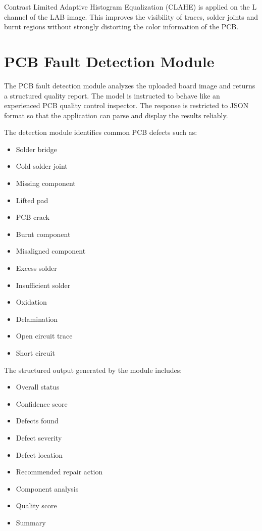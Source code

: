 \documentclass[12pt,a4paper]{report}
\begin{document}
Contrast Limited Adaptive Histogram Equalization (CLAHE) is applied on the L channel of the LAB image. This improves the visibility of traces, solder joints and burnt regions without strongly distorting the color information of the PCB.

\chapter{PCB Fault Detection Module}

The PCB fault detection module analyzes the uploaded board image and returns a structured quality report. The model is instructed to behave like an experienced PCB quality control inspector. The response is restricted to JSON format so that the application can parse and display the results reliably.

The detection module identifies common PCB defects such as:

\begin{itemize}
    \item Solder bridge
    \item Cold solder joint
    \item Missing component
    \item Lifted pad
    \item PCB crack
    \item Burnt component
    \item Misaligned component
    \item Excess solder
    \item Insufficient solder
    \item Oxidation
    \item Delamination
    \item Open circuit trace
    \item Short circuit
\end{itemize}

The structured output generated by the module includes:

\begin{itemize}
    \item Overall status
    \item Confidence score
    \item Defects found
    \item Defect severity
    \item Defect location
    \item Recommended repair action
    \item Component analysis
    \item Quality score
    \item Summary
\end{itemize}
\end{document}
